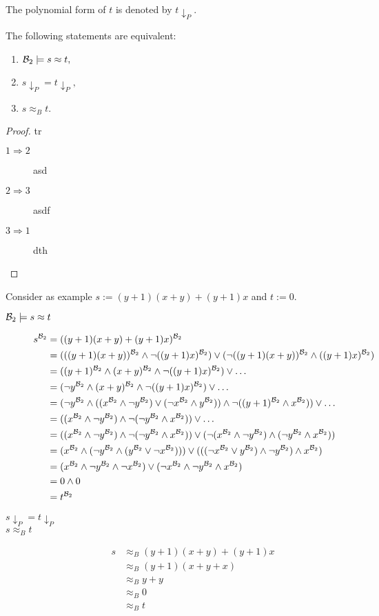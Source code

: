 	The polynomial form of $t$ is denoted by $t{\downarrow_P}$.
	\begin{theorem}
	The following statements are equivalent:
	\begin{enumerate}
	\item ${\mathcal{B}_2}\models s\approx t,$
	\item $s{\downarrow_P}=t{\downarrow_P},$
	\item $s\approx_B t.$
	\end{enumerate}
	\end{theorem}
	\begin{proof} tr
	\begin{description}
	\item[$1\Rightarrow 2$] asd
	\item[$2\Rightarrow 3$] asdf
	\item[$3\Rightarrow 1$] dth
	\end{description}
	\end{proof}
	Consider as example $s:=(y+1)(x+y)+(y+1)x$ and $t:=0$.
	\begin{description}
	\item[${\mathcal{B}_2}\models s\approx t$] 
		\begin{align*}
		s^{\mathcal{B}_2}&=((y+1)(x+y)+(y+1)x)^{\mathcal{B}_2}\\
		&=(((y+1)(x+y))^{{\mathcal{B}_2}}\wedge \neg ((y+1)x)^{\mathcal{B}_2})\vee(\neg ((y+1)(x+y))^{\mathcal{B}_2}\wedge ((y+1)x)^{\mathcal{B}_2})\\
		&=((y+1)^{\mathcal{B}_2}\wedge(x+y)^{\mathcal{B}_2}\wedge \neg ((y+1)x)^{\mathcal{B}_2})\vee\dots\\
		&=(\neg y^{\mathcal{B}_2}\wedge(x+y)^{\mathcal{B}_2}\wedge \neg ((y+1)x)^{\mathcal{B}_2})\vee\dots\\
		&=(\neg y^{\mathcal{B}_2}\wedge((x^{\mathcal{B}_2}\wedge\neg y^{\mathcal{B}_2})\vee(\neg x^{\mathcal{B}_2}\wedge y^{\mathcal{B}_2}))\wedge \neg ((y+1)^{\mathcal{B}_2}\wedge x^{\mathcal{B}_2}))\vee\dots\\
		&=((x^{\mathcal{B}_2}\wedge\neg y^{\mathcal{B}_2})\wedge \neg (\neg y^{\mathcal{B}_2}\wedge x^{\mathcal{B}_2}))\vee\dots\\
		&=((x^{\mathcal{B}_2}\wedge\neg y^{\mathcal{B}_2})\wedge \neg (\neg y^{\mathcal{B}_2}\wedge x^{\mathcal{B}_2}))\vee(\neg(x^{\mathcal{B}_2}\wedge\neg y^{\mathcal{B}_2})\wedge (\neg y^{\mathcal{B}_2}\wedge x^{\mathcal{B}_2}))\\
		&=(x^{\mathcal{B}_2}\wedge(\neg y^{\mathcal{B}_2}\wedge (y^{\mathcal{B}_2}\vee\neg x^{\mathcal{B}_2})))\vee(((\neg x^{\mathcal{B}_2}\vee y^{\mathcal{B}_2})\wedge \neg y^{\mathcal{B}_2})\wedge x^{\mathcal{B}_2})\\
		&=(x^{\mathcal{B}_2}\wedge\neg y^{\mathcal{B}_2}\wedge \neg x^{\mathcal{B}_2})\vee(\neg x^{\mathcal{B}_2}\wedge \neg y^{\mathcal{B}_2}\wedge x^{\mathcal{B}_2})\\
		&=0\wedge 0\\
		&=t^{\mathcal{B}_2}
		\end{align*}
	\item[$s{\downarrow_P}=t{\downarrow_P}$] 
	\item[$s\approx_B t$] 
		\begin{align*}
		s&\approx_B (y+1)(x+y)+(y+1)x\\
		&\approx_B (y+1)(x+y+x)\\
		&\approx_B y+y\\
		&\approx_B 0\\
		&\approx_B t\\
		\end{align*}
	\end{description}
	